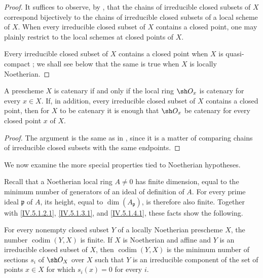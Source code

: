 \begin{proof}
It suffices to observe, by , that the chains of
irreducible closed subsets of $X$ correspond bijectively to the
chains of irreducible closed subsets of a local scheme of $X$.
When every irreducible closed subset of $X$ contains a closed point,
one may plainly restrict to the local schemes at closed points of
$X$.

Every irreducible closed subset of $X$ contains a closed point when
$X$ is quasi-compact ; we shall see below
 that the same is true when $X$ is locally
Noetherian.
\end{proof}

\begin{corollary}[5.1.5]
\label{IV.5.1.5}
A prescheme $X$ is catenary if and only if the local ring $\sh O_x$
is catenary for every $x\in X$.
If, in addition, every irreducible closed subset of $X$ contains a
closed point, then for $X$ to be catenary it is enough that
$\sh O_x$ be catenary for every closed point $x$ of $X$.
\end{corollary}

\begin{proof}
The argument is the same as in , since it is a matter
of comparing chains of irreducible closed subsets with the same
endpoints.
\end{proof}

\begin{env}[5.1.6]
\label{IV.5.1.6}
We now examine the more special properties tied to Noetherian
hypotheses.

Recall  that a Noetherian local ring $A\ne0$ has
finite dimension, equal to the minimum number of generators of an
ideal of definition of $A$.
For every prime ideal $\mathfrak p$ of $A$, its height, equal to
$\dim(A_{\mathfrak p})$, is therefore also finite.
Together with \eqref{IV.5.1.2.1}, \eqref{IV.5.1.3.1}, and
\eqref{IV.5.1.4.1}, these facts show the following.
\end{env}

\begin{proposition}[5.1.7]
\label{IV.5.1.7}
For every nonempty closed subset $Y$ of a locally Noetherian
prescheme $X$, the number $\operatorname{codim}(Y,X)$ is finite.
If $X$ is Noetherian and affine and $Y$ is an irreducible closed
subset of $X$, then $\operatorname{codim}(Y,X)$ is the minimum
number of sections $s_i$ of $\sh O_X$ over $X$ such that $Y$ is an
irreducible component of the set of points $x\in X$ for which
$s_i(x)=0$ for every $i$.
\end{proposition}

